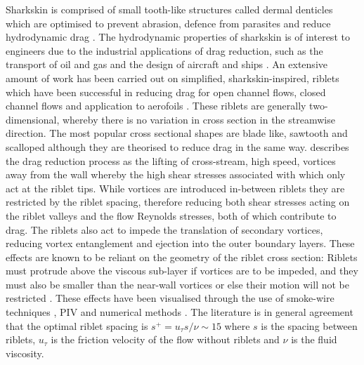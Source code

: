 \documentclass[12pt,oneside,a4paper]{article}
\begin{document}
Sharkskin is comprised of small tooth-like structures called dermal denticles which are optimised to prevent abrasion, defence from parasites and reduce hydrodynamic drag \citep{fletcher2014}. The hydrodynamic properties of sharkskin is of interest to engineers due to the industrial applications of drag reduction, such as the transport of oil and gas and the design of aircraft and ships \citep{dean2010}. An extensive amount of work has been carried out on simplified, sharkskin-inspired, riblets which have been successful in reducing drag for open channel flows, closed channel flows and application to aerofoils \citep{bixler2013review}. These riblets are generally two-dimensional, whereby there is no variation in cross section in the streamwise direction. The most popular cross sectional shapes are blade like, sawtooth and scalloped although they are theorised to reduce drag in the same way. \cite{dean2010} describes the drag reduction process as the lifting of cross-stream, high speed, vortices away from the wall whereby the high shear stresses associated with which only act at the riblet tips. While vortices are introduced in-between riblets they are restricted by the riblet spacing, therefore reducing both shear stresses acting on the riblet valleys and the flow Reynolds stresses, both of which contribute to drag. The riblets also act to impede the translation of secondary vortices, reducing vortex entanglement and ejection into the outer boundary layers. These effects are known to be reliant on the geometry of the riblet cross section: Riblets must protrude above the viscous sub-layer if vortices are to be impeded, and they must also be smaller than the near-wall vortices or else their motion will not be restricted \citep{dean2010}. These effects have been visualised through the use of smoke-wire techniques \citep{lee2001}, PIV \citep{lee2008} and numerical methods \citep{goldstein1995}. The literature is in general agreement that the optimal riblet spacing is $s^+ =  u_\tau s/\nu \sim 15$ where $s$ is the spacing between riblets, $u_\tau$ is the friction velocity of the flow without riblets and $\nu$ is the fluid viscosity.
\end{document}
